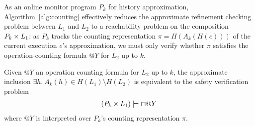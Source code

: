 As an online monitor program $P_k$ for history approximation,
Algorithm~\ref{alg:counting} effectively reduces the approximate refinement
checking problem between $L_1$ and $L_2$ to a reachability problem on the
composition $P_k \times L_1$: as $P_k$ tracks the counting representation $\pi =
\Pi(A_k(H(e)))$ of the current execution $e$'s approximation, we must only
verify whether $\pi$ satisfies the operation-counting formula $@Y$ for $L_2$ up
to $k$.

\begin{corollary}

  Given $@Y$ an operation counting formula for $L_2$ up to $k$, the approximate
  inclusion $\exists h.\ A_k(h) \in H(L_1) \setminus H(L_2)$ is equivalent to
  the safety verification problem
  \begin{align*}
    (P_k \times L_1) |= \Box @Y
  \end{align*}
  where $@Y$ is interpreted over $P_k$'s counting representation $\pi$.

\end{corollary}

